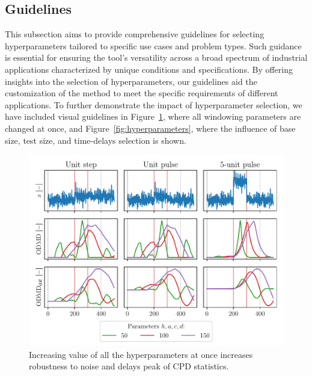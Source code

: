 \subsection{Guidelines}\label{sec:guidelines}
This subsection aims to provide comprehensive guidelines for selecting hyperparameters tailored to specific use cases and problem types. Such guidance is essential for ensuring the tool's versatility across a broad spectrum of industrial applications characterized by unique conditions and specifications. By offering insights into the selection of hyperparameters, our guidelines aid the customization of the method to meet the specific requirements of different applications. To further demonstrate the impact of hyperparameter selection, we have included visual guidelines in Figure~\ref{fig:hyperparameters-all}, where all windowing parameters are changed at once, and Figure~\ref{fig:hyperparameters}, where the influence of base size, test size, and time-delays selection is shown.
\begin{figure}[H]
    \centering
    \includegraphics[width=\linewidth]{figures/parameters-influence-allatonce.pdf}
    \caption{Increasing value of all the hyperparameters at once increases robustness to noise and delays peak of CPD statistics.}\label{fig:hyperparameters-all}
\end{figure}

